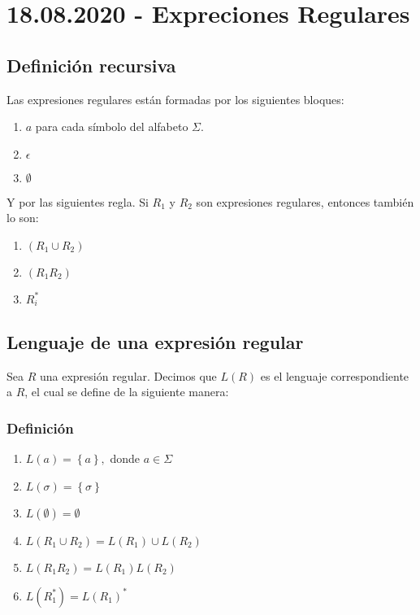 \documentclass[a4paper,dvipsnames]{book}
\begin{document}
\section{18.08.2020 - Expreciones Regulares}
\label{sec:expreciones_regulares}

\subsection{Definición recursiva}
\label{ssec:definicion_recursiva}

Las expresiones regulares están formadas por los siguientes bloques:
\begin{enumerate}
    \item \(a\) para cada símbolo del alfabeto \(\Sigma\).
    \item \(\epsilon\)
    \item \(\emptyset\)
\end{enumerate}

Y por las siguientes regla. Si \(R_1\) y \(R_2\) son expresiones regulares,
entonces también lo son:

\begin{enumerate}
    \item \(\left(R_1\cup R_2\right)\)
    \item \(\left(R_1R_2\right)\)
    \item \(R_{i}^{*}\)
\end{enumerate}

\subsection{Lenguaje de una expresión regular}
\label{ssec:lenguaje_de_una_expresion_regular}

Sea \(R\) una expresión regular. Decimos que \(L\left(R\right)\) es el lenguaje
correspondiente a \(R\), el cual se define de la siguiente manera:

\subsubsection{Definición}

\begin{enumerate}
    \item \(L\left(a\right) = \left\{a\right\},\) donde \(a\in \Sigma \)
    \item \(L\left(\sigma \right) = \left\{\sigma \right\} \)
    \item \(L\left(\emptyset\right) = \emptyset\)
    \item \(L\left(R_1\cup R_2\right) = L\left(R_1\right)\cup L\left(R_2\right)\)
    \item \(L\left(R_1R_2\right)=L\left(R_1\right)L\left(R_2\right)\)
    \item \(L\left(R^{*}_{1}\right)=L\left(R_1\right)^{*}\)
\end{enumerate}
\end{document}
